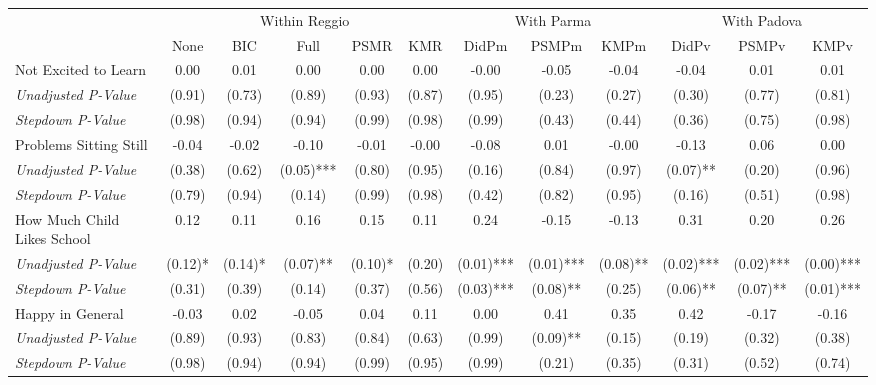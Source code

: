 \begin{tabular}{l c c c c c c c c c c c}
\toprule
& \multicolumn{5}{c}{Within Reggio} & \multicolumn{3}{c}{With Parma} & \multicolumn{3}{c}{With Padova} \\\cmidrule(lr){2-6} \cmidrule(lr){7-9} \cmidrule(lr){10-12}
 & None & BIC & Full & PSMR & KMR & DidPm & PSMPm & KMPm & DidPv & PSMPv & KMPv \\
\midrule
Not Excited to Learn & 0.00 & 0.01 & 0.00 & 0.00 & 0.00 & -0.00 & -0.05 & -0.04 & -0.04 & 0.01 & 0.01 \\
\quad \textit{Unadjusted P-Value} & (0.91) & (0.73) & (0.89) & (0.93) & (0.87) & (0.95) & (0.23) & (0.27) & (0.30) & (0.77) & (0.81) \\
\quad \textit{Stepdown P-Value} & (0.98) & (0.94) & (0.94) & (0.99) & (0.98) & (0.99) & (0.43) & (0.44) & (0.36) & (0.75) & (0.98) \\
Problems Sitting Still & -0.04 & -0.02 & -0.10 & -0.01 & -0.00 & -0.08 & 0.01 & -0.00 & -0.13 & 0.06 & 0.00 \\
\quad \textit{Unadjusted P-Value} & (0.38) & (0.62) & (0.05)*** & (0.80) & (0.95) & (0.16) & (0.84) & (0.97) & (0.07)** & (0.20) & (0.96) \\
\quad \textit{Stepdown P-Value} & (0.79) & (0.94) & (0.14) & (0.99) & (0.98) & (0.42) & (0.82) & (0.95) & (0.16) & (0.51) & (0.98) \\
How Much Child Likes School & 0.12 & 0.11 & 0.16 & 0.15 & 0.11 & 0.24 & -0.15 & -0.13 & 0.31 & 0.20 & 0.26 \\
\quad \textit{Unadjusted P-Value} & (0.12)* & (0.14)* & (0.07)** & (0.10)* & (0.20) & (0.01)*** & (0.01)*** & (0.08)** & (0.02)*** & (0.02)*** & (0.00)*** \\
\quad \textit{Stepdown P-Value} & (0.31) & (0.39) & (0.14) & (0.37) & (0.56) & (0.03)*** & (0.08)** & (0.25) & (0.06)** & (0.07)** & (0.01)*** \\
Happy in General & -0.03 & 0.02 & -0.05 & 0.04 & 0.11 & 0.00 & 0.41 & 0.35 & 0.42 & -0.17 & -0.16 \\
\quad \textit{Unadjusted P-Value} & (0.89) & (0.93) & (0.83) & (0.84) & (0.63) & (0.99) & (0.09)** & (0.15) & (0.19) & (0.32) & (0.38) \\
\quad \textit{Stepdown P-Value} & (0.98) & (0.94) & (0.94) & (0.99) & (0.95) & (0.99) & (0.21) & (0.35) & (0.31) & (0.52) & (0.74) \\
\bottomrule
\end{tabular}
